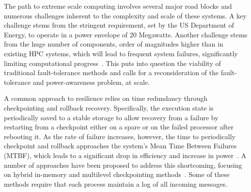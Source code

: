 
The path to extreme scale computing involves several major road blocks and numerous challenges inherent to the complexity and scale of these systems. A key challenge stems from the stringent requirement, set by the US Department of Energy, to operate in a power envelope of 20 Megawatts. Another challenge stems from the huge number of components, order of magnitudes higher than in existing HPC systems, which will lead to frequent system failures, significantly limiting computational progress~\cite{Bergman08exascalecomputing}. This puts into question the viability of traditional fault-tolerance methods and calls for a reconsideration of the fault-tolerance and power-awareness problem, at scale.

A common approach to resilience relies on time redundancy through checkpointing and rollback recovery. Specifically, the execution state is periodically saved to a stable storage to allow recovery from a failure by restarting from a checkpoint either on a spare or on the failed processor after rebooting it. As the rate of failure increases, however, the time to periodically checkpoint and rollback approaches the system's Mean Time Between Failures (MTBF), which leads to a significant drop in efficiency and increase in power~\cite{Elnozahy:02:Survey,kalaiselvi_sadhana_2000,Chandy:1985:DSD:214451.214456}. A number of approaches have been proposed to address this shortcoming, focusing on hybrid in-memory and multilevel checkpointing methods~\cite{Gao:2015:RIC:2751205.2751212}. %
Some of these methods require that each process maintain a log of all incoming messages. 

